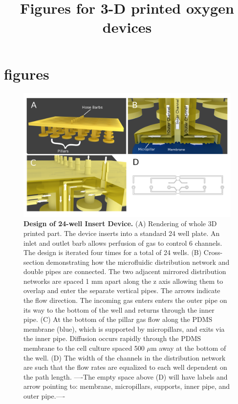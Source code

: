 \documentclass[]{article}
\title{Figures for  3-D printed oxygen devices}
\author{}
\begin{document}

\section{figures}

\begin{figure}[H]
\includegraphics[scale=.75]{fig1.png} 
\caption{
{\bf Design of 24-well Insert Device.}
(A) Rendering of whole 3D printed part.
The device inserts into a standard 24 well plate.
An inlet and outlet barb allows perfusion of gas to control 6 channels.
The design is iterated four times for a total of 24 wells.
(B) Cross-section demonstrating how the microfluidic distribution network and double pipes are connected. 
The two adjacent mirrored distribution networks are spaced 1 mm apart along the z axis allowing them to overlap and enter the separate vertical pipes.
The arrows indicate the flow direction.
The incoming gas enters enters the outer pipe on its way to the bottom of the well and returns through the inner pipe.
(C) At the bottom of the pillar gas flow along the PDMS membrane (blue), which is supported by micropillars, and exits via the inner pipe.
Diffusion occurs rapidly through the PDMS membrane to the cell culture spaced 500 $\mu$m away at the bottom of the well.
(D) The width of the channels in the distribution network are such that the flow rates are equalized to each well dependent on the path length.
----The empty space above (D) will have labels and arrow pointing to: membrane, micropillars, supports, inner pipe, and outer pipe.----
}
\label{figure1}
\end{figure}
\end{document}
